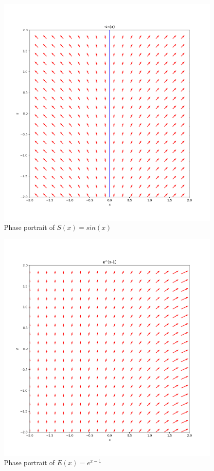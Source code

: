 \documentclass[11pt]{article}
\begin{document}
\begin{figure}[h!]
    \centering
    \includegraphics{phase6.png}
    \caption{Phase portrait of $S(x) = sin(x)$}
    \label{fig:phase6}
\end{figure}

\begin{figure}[h!]
    \centering
    \includegraphics{phase7.png}
    \caption{Phase portrait of $E(x) = e^{x-1}$}
    \label{fig:phase7}
\end{figure}
\end{document}
